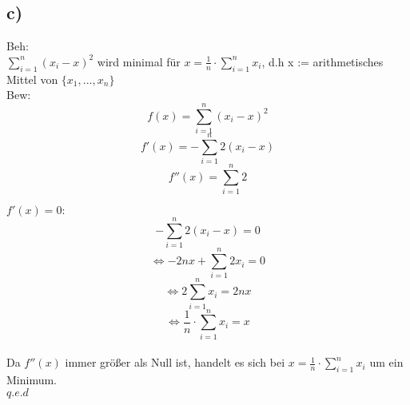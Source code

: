 \documentclass[a4paper,11pt,twoside]{article}
\begin{document}
\subsection*{c)}

Beh:\\ $\sum_{i=1}^{n} (x_i-x)^2$ wird minimal für $x = \frac{1}{n} \cdot \sum_{i=1}^{n}x_i$, d.h x := arithmetisches Mittel von $\{x_1, ..., x_n\}$\\

Bew: \\
\[f(x) = \sum_{i=1}^{n} (x_i -x)^2\]
\[f'(x) = -\sum_{i=1}^{n} 2(x_i -x)\]
\[f''(x) = \sum_{i=1}^{n} 2\]

\underline{$f'(x)=0:$}\\
\[-\sum_{i=1}^{n}2(x_i -x) = 0\]
\[\Leftrightarrow -2nx + \sum_{i=1}^{n}2x_i = 0\]
\[\Leftrightarrow 2\sum_{i=1}^{n}x_i = 2nx\]
\[\Leftrightarrow \frac{1}{n} \cdot \sum_{i=1}^{n}x_i = x\]\\

Da $f''(x)$ immer größer als Null ist, handelt es sich bei $x = \frac{1}{n} \cdot \sum_{i=1}^{n}x_i$ um ein Minimum.\\
$q.e.d$
\end{document}
